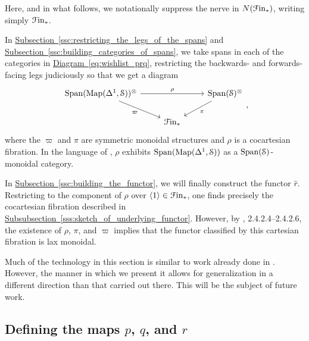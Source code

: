 \documentclass[main.tex]{subfiles}
\begin{document}
\begin{note}
  Here, and in what follows, we notationally suppress the nerve in $N(\mathcal{F}\mathrm{in}_{*})$, writing simply $\mathcal{F}\mathrm{in}_{*}$.
\end{note}

In \hyperref[ssc:restricting_the_legs_of_the_spans]{Subsection~\ref*{ssc:restricting_the_legs_of_the_spans}} and \hyperref[ssc:building_categories_of_spans]{Subsection~\ref*{ssc:building_categories_of_spans}}, we take spans in each of the categories in \hyperref[eq:wishlist_prq]{Diagram~\ref*{eq:wishlist_prq}}, restricting the backwards- and forwards-facing legs judiciously so that we get a diagram
\begin{equation}
  \label{eq:wishlist_pivarpirho}
  \begin{tikzcd}
    \Span(\Map(\Delta^{1}, \S))^{\otimes}
    \arrow[rr, "\rho"]
    \arrow[dr, swap, "\varpi"]
    && \Span(\S)^{\otimes}
    \arrow[dl, "\pi"]
    \\
    & \Finp
  \end{tikzcd},
\end{equation}
where the $\varpi$ and $\pi$ are symmetric monoidal structures and $\rho$ is a cocartesian fibration. In the language of \cite{luriehigheralgebra}, $\rho$ exhibits $\mathrm{Span}(\mathrm{Map}(\Delta^{1}, \mathcal{S}))$ as a $\mathrm{Span}(\mathcal{S})$-monoidal category.

In \hyperref[ssc:building_the_functor]{Subsection~\ref*{ssc:building_the_functor}}, we will finally construct the functor $\hat{r}$. Restricting to the component of $\rho$ over $\langle 1 \rangle \in \mathcal{F}\mathrm{in}_{*}$, one finds precisely the cocartesian fibration described in \hyperref[sss:sketch_of_underlying_functor]{Subsubsection~\ref*{sss:sketch_of_underlying_functor}}. However, by \cite{luriehigheralgebra}, 2.4.2.4--2.4.2.6, the existence of $\rho$, $\pi$, and $\varpi$ implies that the functor classified by this cartesian fibration is lax monoidal.

Much of the technology in this section is similar to work already done in \cite{spectralmackeyfunctors2}. However, the manner in which we present it allows for generalization in a different direction than that carried out there. This will be the subject of future work.

\subsection{Defining the maps \texorpdfstring{$p$}{p}, \texorpdfstring{$q$}{q}, and \texorpdfstring{$r$}{r}}
\label{ssc:defining_the_maps_p_q_and_r}
\end{document}
